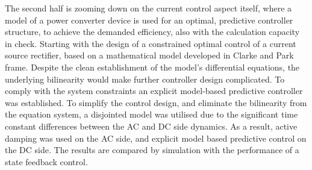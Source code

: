 The second half is zooming down on the current control aspect itself, where a model of a power converter device is used for an optimal, predictive controller structure, to achieve the demanded efficiency, also with the calculation capacity in check. Starting with the design of a constrained optimal control of a current source rectifier, based on a mathematical model developed in Clarke and Park frame. Despite the clean establishment of the model's differential equations, the underlying bilinearity would make further controller design complicated. To comply with the system constraints an explicit model-based predictive controller was established. To simplify the control design, and eliminate the bilinearity from the equation system, a disjointed model was utilised due to the significant time constant differences between the AC and DC side dynamics. As a result, active damping was used on the AC side, and explicit model based predictive control on the DC side. The results are compared by simulation with the performance of a state feedback control.\\









